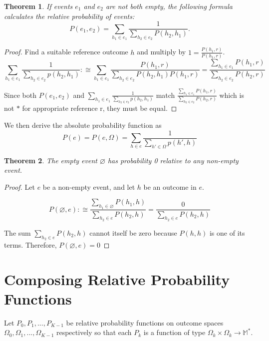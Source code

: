 \documentclass[twoside]{article}
\theoremstyle{plain}%
\newtheorem{theorem}{Theorem}[section]
\theoremstyle{definition}
\theoremstyle{remark}
\begin{document}
\begin{theorem}
If events \(e_1\) and \(e_2\) are not both empty, the following formula calculates the relative probability of events:
\[P(e_1, e_2) = \sum_{h_1 \in e_1} \frac{1}{\sum_{h_2 \in e_2} P(h_2, h_1)}.\]
\end{theorem}

\begin{proof}
Find a suitable reference outcome \(h\) and multiply by \(1 = \frac{P(h_1, r)}{P(h_1, r)}\).
\[\sum_{h_1 \in e_1} \frac{1}{\sum_{h_2 \in e_2} p(h_2, h_1)} :\cong \sum_{h_1 \in e_1} \frac{P(h_1, r)}{\sum_{h_2 \in e_2} P(h_2, h_1) P(h_1, r)} = \frac{\sum_{h_1 \in e_1} P(h_1, r)}{\sum_{h_2 \in e_2} P(h_2, r)}\]

Since both \(P(e_1, e_2)\) and \(\sum_{h_1 \in e_1} \frac{1}{\sum_{h_2 \in e_2} p(h_2, h_1)}\) match  \(\frac{\sum_{h_1 \in e_1} P(h_1, r)}{\sum_{h_2 \in e_2} P(h_2, r)}\) which is not \(\ast\) for appropriate reference r, they must be equal.
\end{proof}

We then derive the absolute probability function as
\[P(e) = P(e, \Omega) = \sum_{h \in e} \frac{1}{\sum_{h' \in \Omega}p(h', h)}\]

\begin{theorem}
\label{thm:empty_event_impossible}
The empty event \(\varnothing\) has probability 0 relative to any non-empty event.
\end{theorem}

\begin{proof}
Let \(e\) be a non-empty event, and let \(h\) be an outcome in \(e\).

\[P(\varnothing, e) :\cong \frac{\sum_{h_1 \in \varnothing} P(h_1, h)}{\sum_{h_2 \in e} P(h_2, h)} = \frac{0}{\sum_{h_2 \in e} P(h_2, h)}\]

The sum \(\sum_{h_2 \in e} P(h_2, h)\) cannot itself be zero because \(P(h, h)\) is one of its terms. Therefore, \(P(\varnothing, e) = 0\)
\end{proof}

\section{Composing Relative Probability Functions}

Let \(P_0, P_1, ..., P_{K-1}\) be relative probability functions on outcome spaces \(\Omega_0, \Omega_1, ..., \Omega_{K-1}\) respectively so that each \(P_k\) is a function of type \(\Omega_k \times \Omega_k \rightarrow \mathbb{M}^{\ast}\).
\end{document}
